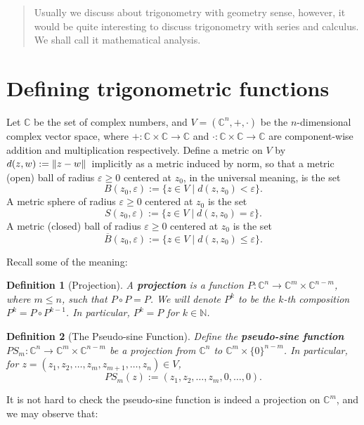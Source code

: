 \documentclass[12pt]{article}
\newtheorem*{definition}{Definition}
\begin{document}
    \begin{abstract}
        Usually we discuss about trigonometry with geometry sense, however, it would be quite interesting to discuss trigonometry with series and calculus. We shall call it mathematical analysis.
    \end{abstract}

    \section*{Defining trigonometric functions}

    Let $\mathbb{C}$ be the set of complex numbers, and $V=(\mathbb{C}^n,+,\cdot)$ be the $n$-dimensional complex vector space, where $+:\mathbb{C}\times\mathbb{C}\to\mathbb{C}$ and $\cdot:\mathbb{C}\times\mathbb{C}\to\mathbb{C}$ are component-wise addition and multiplication respectively. Define a metric on $V$ by $d(z,w):=\norm*{z-w}$ implicitly as a metric induced by norm, so that a metric (open) ball of radius $\varepsilon\geq 0$ centered at $z_0$, in the universal meaning, is the set \[B(z_0,\varepsilon):=\{z\in V\mid d(z,z_0)<\varepsilon\}.\] A metric sphere of radius $\varepsilon\geq 0$ centered at $z_0$ is the set \[S(z_0,\varepsilon):=\{z\in V\mid d(z,z_0)=\varepsilon\}.\] A metric (closed) ball of radius $\varepsilon\geq 0$ centered at $z_0$ is the set \[\overline{B}(z_0,\varepsilon):=\{z\in V\mid d(z,z_0)\leq\varepsilon\}.\]
    
    Recall some of the meaning:

    \begin{definition}[Projection]
        A \textbf{projection} is a function $P:\mathbb{C}^n\to\mathbb{C}^m\times \mathbb{C}^{n-m}$, where $m\leq n$, such that $P\circ P = P$. We will denote $P^k$ to be the $k$-th composition $P^k=P\circ P^{k-1}$. In particular, $P^k=P$ for $k\in\mathbb{N}$.
    \end{definition}

    \begin{definition}[The Pseudo-sine Function]
        Define the \textbf{pseudo-sine function} $PS_m:\mathbb{C}^n\to\mathbb{C}^m\times \mathbb{C}^{n-m}$ be a projection from $\mathbb{C}^n$ to $\mathbb{C}^m\times\{0\}^{n-m}$. In particular, for $z=(z_1,z_2,\dots,z_m,z_{m+1},\dots,z_n)\in V$,  \[PS_m(z):=(z_1,z_2,\dots,z_m,0,\dots,0).\]
    \end{definition}

    It is not hard to check the pseudo-sine function is indeed a projection on $\mathbb{C}^m$, and we may observe that:
\end{document}
